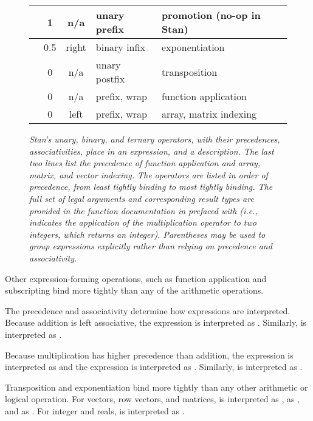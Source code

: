 \begin{figure}
\begin{center}
\begin{tabular}{c|ccl|l}
\code{+} & 1 & n/a & unary prefix & promotion (no-op in Stan)
\\ \hline
\code{\textasciicircum} & 0.5 & right & binary infix & exponentiation
\\ \hline
\code{'} & 0 & n/a & unary postfix & transposition
\\ \hline \hline
\code{()} & 0 & n/a & prefix, wrap & function application
\\
\code{[]} & 0 & left & prefix, wrap & array, matrix indexing
\end{tabular}
\end{center}
\caption{\small\it Stan's unary, binary, and ternary operators, with their
  precedences, associativities, place in an expression, and a
  description.  The last two lines list the precedence of function
  application and array, matrix, and vector indexing. The operators are
  listed in order of precedence, from least tightly binding to most
  tightly binding.  The full set of legal arguments and corresponding
  result types are provided in the function documentation in
   prefaced with  (i.e.,
   indicates the application of the
  multiplication operator to two integers, which returns an integer).
  Parentheses may be used to group expressions explicitly rather than
  relying on precedence and
  associativity.}\label{operator-precedence.figure}
\end{figure}
%
Other expression-forming operations, such as function application and
subscripting bind more tightly than any of the arithmetic operations.

The precedence and associativity determine how expressions are
interpreted.  Because addition is left associative, the expression
\mbox{} is interpreted as \mbox{}.  Similarly,
\mbox{} is interpreted as \mbox{}.

Because multiplication has higher precedence than addition, the
expression \mbox{} is interpreted as \mbox{} and the
expression \mbox{} is interpreted as \mbox{}.  Similarly,
\mbox{} is interpreted as \mbox{}.

Transposition and exponentiation bind more tightly
than any other arithmetic or logical operation.
For vectors, row vectors, and matrices,
\mbox{} is interpreted as \mbox{}, \mbox{} as
\mbox{}, and \mbox{} as \mbox{}.
For integer and reals,
\mbox{}
is interpreted as \mbox{}.


